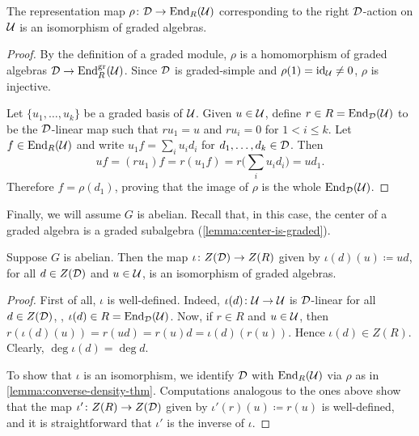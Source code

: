 
\begin{lemma}\label{lemma:converse-density-thm}
    The representation map $\rho\colon \mathcal{D} \to \operatorname{End}_R (\mathcal U)$ corresponding to the right $\mathcal{D}$-action on $\mathcal U$
    is an isomorphism of graded algebras.
\end{lemma}

\begin{proof}
    By the definition of a graded module, $\rho$ is a homomorphism of graded algebras $\mathcal{D} \to \operatorname{End}_{R}^{\mathrm{gr}} (\mathcal U)$. 
    Since $\mathcal{D}$ is graded-simple and $\rho(1) = \operatorname{id}_{\mathcal U} \neq 0$, $\rho$ is injective.

    Let $\{u_1, \ldots, u_k \}$ be a graded basis of $\mathcal U$. 
    Given $u\in \mathcal U$, define $r\in R = \operatorname{End}_{\mathcal{D}} (\mathcal U)$ to be the $\mathcal{D}$-linear map such that $r u_1 = u$ and $r u_i = 0$ for $1< i \leq k$. 
    Let $f\in \operatorname{End}_R (\mathcal U)$ and write $u_1 f = \sum_i u_i d_i$ for $d_1, \ldots, d_k\in \mathcal{D}$. 
    Then
    \[
        u f = (r u_1) f = r (u_1 f) = r\big( \sum_i u_i d_i \big) = u d_1.
    \]
    Therefore $f = \rho(d_1)$, proving that the image of $\rho$ is the whole $\operatorname{End}_{\mathcal{D}} (\mathcal U)$.
\end{proof}
 
Finally, we will assume $G$ is abelian. 
Recall that, in this case, the center of a graded algebra is a graded subalgebra (\cref{lemma:center-is-graded}). 

\begin{prop}\label{prop:R-and-D-have-the-same-center}
    Suppose $G$ is abelian. 
    Then the map $\iota\colon Z(\mathcal{D}) \to Z(R)$ given by $\iota (d)(u) \coloneqq ud$, for all $d\in Z(\mathcal{D})$ and $u\in \mathcal U$, is an isomorphism of graded algebras.
\end{prop}

\begin{proof}
    First of all, $\iota$ is well-defined. 
    Indeed, $\iota(d)\colon \mathcal U \to \mathcal U$ is $\mathcal{D}$-linear for all $d\in Z(\mathcal{D})$, \ie, $\iota(d) \in R = \operatorname{End}_{\mathcal{D}}(\mathcal U)$. 
    Now, if $r\in R$ and $u \in \mathcal U$, then $r (\iota(d)(u)) = r(ud) = r(u) d = \iota(d) (r(u))$. 
    Hence $\iota(d) \in Z(R)$. 
    Clearly, $\deg \iota(d) = \deg d$. 
    
    To show that $\iota$ is an isomorphism, we identify $\mathcal{D}$ with $\operatorname{End}_R (\mathcal U)$ via $\rho$ as in \cref{lemma:converse-density-thm}. 
    Computations analogous to the ones above show that the map $\iota'\colon Z(R) \to Z(\mathcal{D})$ given by $\iota'(r)(u) \coloneqq r(u)$ is well-defined, and it is straightforward that $\iota'$ is the inverse of $\iota$. 
\end{proof}


